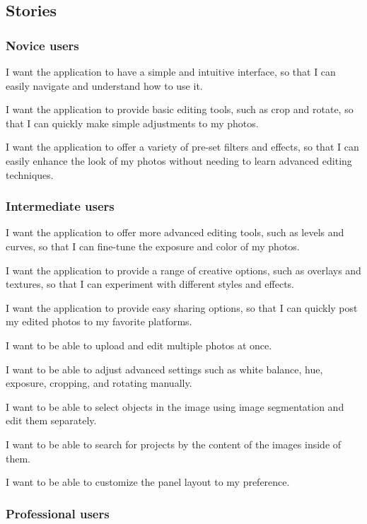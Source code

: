 \documentclass[11pt,a4paper]{article}
\begin{document}
\pagebreak

\subsection*{Stories}

\subsubsection*{Novice users}

I want the application to have a simple and intuitive interface, so that I can
easily navigate and understand how to use it.

I want the application to provide basic editing tools, such as crop and rotate,
so that I can quickly make simple adjustments to my photos.

I want the application to offer a variety of pre-set filters and effects, so
that I can easily enhance the look of my photos without needing to learn
advanced editing techniques.

\subsubsection*{Intermediate users}

I want the application to offer more advanced editing tools, such as levels and
curves, so that I can fine-tune the exposure and color of my photos.

I want the application to provide a range of creative options, such as overlays
and textures, so that I can experiment with different styles and effects.

I want the application to provide easy sharing options, so that I can quickly
post my edited photos to my favorite platforms.

I want to be able to upload and edit multiple photos at once.

I want to be able to adjust advanced settings such as white balance, hue,
exposure, cropping, and rotating manually.

I want to be able to select objects in the image using image segmentation and
edit them separately.

I want to be able to search for projects by the content of the images inside of
them.

I want to be able to customize the panel layout to my preference.


\subsubsection*{Professional users}
\end{document}
